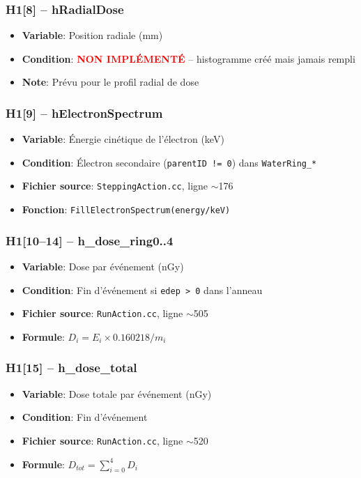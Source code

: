 \documentclass[11pt,a4paper]{article}
\begin{document}
\subsubsection{H1[8] -- hRadialDose}
\begin{itemize}
    \item \textbf{Variable}: Position radiale (mm)
    \item \textbf{Condition}: \textcolor{red}{\textbf{NON IMPLÉMENTÉ}} -- histogramme créé mais jamais rempli
    \item \textbf{Note}: Prévu pour le profil radial de dose
\end{itemize}

\subsubsection{H1[9] -- hElectronSpectrum}
\begin{itemize}
    \item \textbf{Variable}: Énergie cinétique de l'électron (keV)
    \item \textbf{Condition}: Électron secondaire (\texttt{parentID != 0}) dans \texttt{WaterRing\_*}
    \item \textbf{Fichier source}: \texttt{SteppingAction.cc}, ligne $\sim$176
    \item \textbf{Fonction}: \texttt{FillElectronSpectrum(energy/keV)}
\end{itemize}

\subsubsection{H1[10--14] -- h\_dose\_ring0..4}
\begin{itemize}
    \item \textbf{Variable}: Dose par événement (nGy)
    \item \textbf{Condition}: Fin d'événement si \texttt{edep > 0} dans l'anneau
    \item \textbf{Fichier source}: \texttt{RunAction.cc}, ligne $\sim$505
    \item \textbf{Formule}: $D_i = E_i \times 0.160218 / m_i$
\end{itemize}

\subsubsection{H1[15] -- h\_dose\_total}
\begin{itemize}
    \item \textbf{Variable}: Dose totale par événement (nGy)
    \item \textbf{Condition}: Fin d'événement
    \item \textbf{Fichier source}: \texttt{RunAction.cc}, ligne $\sim$520
    \item \textbf{Formule}: $D_{tot} = \sum_{i=0}^{4} D_i$
\end{itemize}
\end{document}
